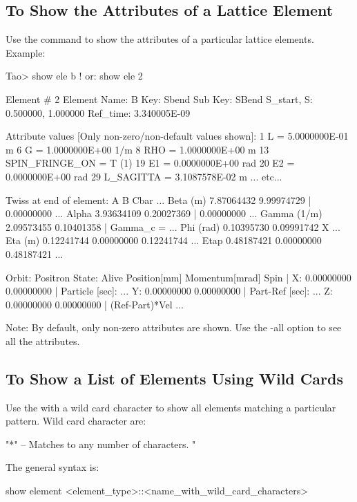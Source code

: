 \documentclass{hitec}
\begin{document}
\subsection{To Show the Attributes of a Lattice Element}

Use the  command to show the attributes of a particular lattice elements. Example:
{\small
\begin{code} 
Tao> show ele b   ! or: show ele 2

 Element #                2
 Element Name: B
 Key: Sbend
 Sub Key: SBend
 S_start, S:    0.500000,    1.000000
 Ref_time:  3.340005E-09

 Attribute values [Only non-zero/non-default values shown]:
    1   L                            =  5.0000000E-01 m
    6   G                            =  1.0000000E+00 1/m
    8   RHO                          =  1.0000000E+00 m
   13   SPIN_FRINGE_ON               =  T (1)
   19   E1                           =  0.0000000E+00 rad
   20   E2                           =  0.0000000E+00 rad
   29   L_SAGITTA                    =  3.1087578E-02 m
		 ... etc...

Twiss at end of element:
                          A              B            Cbar    ...
  Beta (m)         7.87064432     9.99974729  |   0.00000000  ...
  Alpha            3.93634109     0.20027369  |   0.00000000  ...
  Gamma (1/m)      2.09573455     0.10401358  |   Gamma_c =   ...
  Phi (rad)        0.10395730     0.09991742            X     ...
  Eta (m)          0.12241744     0.00000000     0.12241744   ...
  Etap             0.48187421     0.00000000     0.48187421   ...

Orbit:  Positron   State: Alive
         Position[mm] Momentum[mrad]        Spin   |
  X:       0.00000000     0.00000000               | Particle [sec]: ...
  Y:       0.00000000     0.00000000               | Part-Ref [sec]: ...
  Z:       0.00000000     0.00000000               | (Ref-Part)*Vel  ...
\end{code}}
Note: By default, only non-zero attributes are shown. Use the -all option to see all the attributes.

\subsection{To Show a List of Elements Using Wild Cards}

Use the  with a wild card character to show all elements matching a particular
pattern. Wild card character are:
{\small
\begin{code}
"*" -- Matches to any number of characters.
"%
\end{code}}
The general syntax is:
{\small
\begin{code}
show element <element_type>::<name_with_wild_card_characters>
\end{code}}
\end{document}
